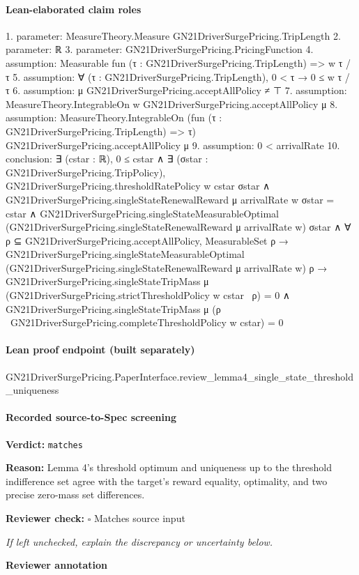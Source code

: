 \documentclass[10pt]{article}
\newcommand{\reviewerbox}{%
  \par\noindent\fbox{\parbox{0.96\linewidth}{\rule{0pt}{0.38in}}}\par
}
\newcommand{\reviewmatch}[1]{%
  \par\noindent\textbf{Reviewer check:} $\square$\; #1\par
  \noindent\emph{If left unchecked, explain the discrepancy or uncertainty below.}\par
}
\begin{document}
\paragraph{Lean-elaborated claim roles}\begin{ReviewVerbatim}
1. parameter: MeasureTheory.Measure GN21DriverSurgePricing.TripLength
2. parameter: ℝ
3. parameter: GN21DriverSurgePricing.PricingFunction
4. assumption: Measurable fun (τ : GN21DriverSurgePricing.TripLength) => w τ / τ
5. assumption: ∀ (τ : GN21DriverSurgePricing.TripLength), 0 < τ → 0 ≤ w τ / τ
6. assumption: μ GN21DriverSurgePricing.acceptAllPolicy ≠ ⊤
7. assumption: MeasureTheory.IntegrableOn w GN21DriverSurgePricing.acceptAllPolicy μ
8. assumption: MeasureTheory.IntegrableOn (fun (τ : GN21DriverSurgePricing.TripLength) => τ) GN21DriverSurgePricing.acceptAllPolicy μ
9. assumption: 0 < arrivalRate
10. conclusion: ∃ (cstar : ℝ),
  0 ≤ cstar ∧
    ∃ (σstar : GN21DriverSurgePricing.TripPolicy),
      GN21DriverSurgePricing.thresholdRatePolicy w cstar σstar ∧
        GN21DriverSurgePricing.singleStateRenewalReward μ arrivalRate w σstar = cstar ∧
          GN21DriverSurgePricing.singleStateMeasurableOptimal
              (GN21DriverSurgePricing.singleStateRenewalReward μ arrivalRate w) σstar ∧
            ∀ ρ ⊆ GN21DriverSurgePricing.acceptAllPolicy,
              MeasurableSet ρ →
                GN21DriverSurgePricing.singleStateMeasurableOptimal
                    (GN21DriverSurgePricing.singleStateRenewalReward μ arrivalRate w) ρ →
                  GN21DriverSurgePricing.singleStateTripMass μ
                        (GN21DriverSurgePricing.strictThresholdPolicy w cstar \ ρ) =
                      0 ∧
                    GN21DriverSurgePricing.singleStateTripMass μ
                        (ρ \ GN21DriverSurgePricing.completeThresholdPolicy w cstar) =
                      0
\end{ReviewVerbatim}

\paragraph{Lean proof endpoint (built separately)}\begin{ReviewVerbatim}
GN21DriverSurgePricing.PaperInterface.review_lemma4_single_state_threshold_uniqueness
\end{ReviewVerbatim}

\paragraph{Recorded source-to-Spec screening}
\textbf{Verdict:} \texttt{matches}
\\
{\raggedright
\textbf{Reason:} Lemma 4's threshold optimum and uniqueness up to the threshold indifference set agree with the target's reward equality, optimality, and two precise zero-\allowbreak{}mass set differences.\allowbreak{}
\par}
\reviewmatch{Matches source input}
\noindent\textbf{Reviewer annotation}\par
\reviewerbox
\clearpage
\hypertarget{source-claim-de2ea96cec45a85c}{}
\end{document}
